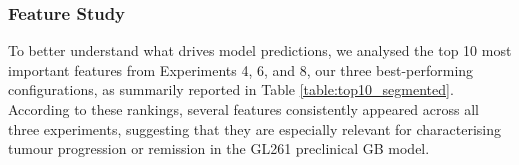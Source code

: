 \documentclass[12pt, a4paper]{report}
\begin{document}
\subsubsection{Feature Study}
To better understand what drives model predictions, we analysed the top 10 most important features from Experiments 4, 6, and 8, our three best-performing configurations, as summarily reported in Table \ref{table:top10_segmented}. According to these rankings, several features consistently appeared across all three experiments, suggesting that they are especially relevant for characterising tumour progression or remission in the GL261 preclinical GB model.

\begin{table}[H]
\centering
\renewcommand{\arraystretch}{1.4} %
\normalsize %
\resizebox{\linewidth}{!}{%

}
\end{table}
\end{document}
